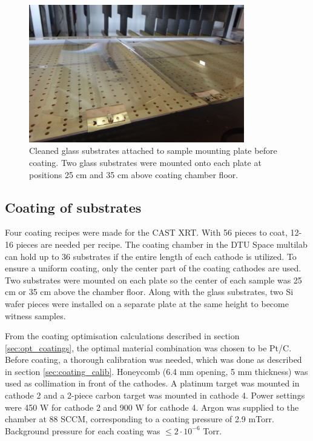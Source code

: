 \begin{figure}[htbp]
  \centering
    \includegraphics[height=6cm]{figures/cast/coating_mount.jpg}
  \caption{\footnotesize Cleaned glass substrates attached to sample mounting plate before coating. Two glass substrates were mounted onto each plate at positions 25 cm and 35 cm above coating chamber floor.}
  \label{fig:coating_mount}
\end{figure}

\subsection{Coating of substrates}
Four coating recipes were made for the CAST XRT. With 56 pieces to coat, 12-16 pieces are needed per recipe. The  coating chamber in the DTU Space multilab can hold up to 36 substrates if the entire length of each cathode is utilized. To ensure a uniform coating, only the center part of the coating cathodes are used. Two substrates were mounted on each plate so the center of each sample was 25 cm or 35 cm above the chamber floor. Along with the glass substrates, two Si wafer pieces were installed on a separate plate at the same height to become witness samples.

From the coating optimisation calculations described in section \ref{sec:opt_coatings}, the optimal material combination was chosen to be Pt/C. Before coating, a thorough calibration was needed, which was done as described in section \ref{sec:coating_calib}. Honeycomb (6.4 mm opening, 5 mm thickness) was used as collimation in front of the cathodes. A platinum target was mounted in cathode 2 and a 2-piece carbon target was mounted in cathode 4. Power settings were 450 W for cathode 2 and 900 W for cathode 4. Argon was supplied to the chamber at 88 SCCM, corresponding to a coating pressure of 2.9 mTorr. Background pressure for each coating was $\leq 2\cdot10^{-6}$ Torr.

